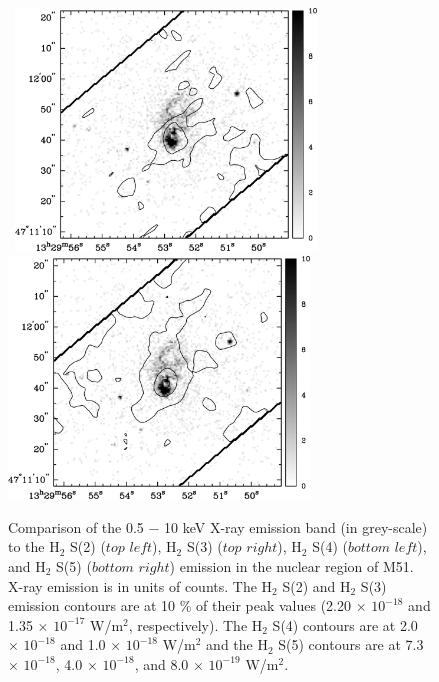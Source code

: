 \documentclass[manuscript]{aastex}
\begin{document}
\begin{figure}[!h]
\centerline{\hbox{\hspace{0.0in}
\includegraphics[width=8cm,angle=0]{bw_x_v_h2s4.jpg}
\hspace{0.1in}
\includegraphics[width=8cm,angle=0]{bw_x_v_h2s5.jpg}}}
\caption{Comparison of the 0.5 $-$ 10 keV X-ray emission band (in grey-scale) to the $\mathrm{H_2}$ S(2) ($top$ $left$), $\mathrm{H_2}$ S(3) ($top$ $right$), $\mathrm{H_2}$ S(4) ($bottom$ $left$), and $\mathrm{H_2}$ S(5) ($bottom$ $right$) emission in the nuclear region of M51.  X-ray emission is in units of counts.  The $\mathrm{H_2}$ S(2) and $\mathrm{H_2}$ S(3) emission contours are at 10 \% of their peak values (2.20 $\times$ ${10^{-18}}$ and 1.35 $\times$ ${10^{-17}}$ W/$\mathrm{m^2}$, respectively).  The $\mathrm{H_2}$ S(4) contours are at  2.0 $\times$ ${10^{-18}}$ and 1.0 $\times$ ${10^{-18}}$ W/$\mathrm{m^2}$ and the $\mathrm{H_2}$ S(5) contours are at 7.3 $\times$ ${10^{-18}}$, 4.0 $\times$ ${10^{-18}}$, and 8.0 $\times$ ${10^{-19}}$ W/$\mathrm{m^2}$.\label{fig11}}
\end{figure}


\clearpage
\end{document}
